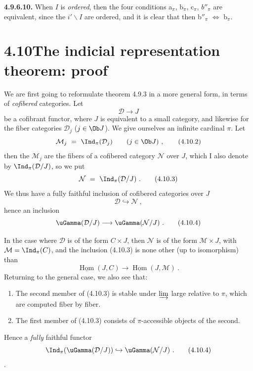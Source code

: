 \textbf{4.9.6.10.} When $I$ is \textit{ordered}, then the four conditions a$_\pi$, b$_\pi$, c$_\pi$, $b''_\pi$ are equivalent, since the $i'\backslash I$ are ordered, and it is clear that then b$''_\pi$ $\Longleftrightarrow$ b$_\pi$. %


\section*{4.10\quad The indicial representation theorem: proof}

We are first going to reformulate theorem 4.9.3 in a more general form, in terms of \textit{cofibered} categories. Let
\[
\mathcal{D} \longrightarrow J \tag*{(4.10.1)}
\]
be a cofibrant functor, where $J$ is equivalent to a small category, and likewise for the fiber categories $\mathcal{D}_j$ ($j \in \Ob J$). We give ourselves an infinite cardinal $\pi$. Let
\[
\mathcal{M}_j \ = \ \Ind_\pi(\mathcal{D}_j) \qquad (j \in \Ob J) \ , \tag*{(4.10.2)}
\]
then the $\mathcal{M}_j$ are the fibers of a cofibered category $\mathcal{N}$ over $J$, which I also denote by $\Ind_\pi(\mathcal{D}/J)$, so we put
\[
\mathcal{N} \ = \ \Ind_\pi(\mathcal{D}/J) \ . \tag*{(4.10.3)}
\]
We thus have a fully faithful inclusion of cofibered categories over $J$
\[
\mathcal{D} \hookrightarrow \mathcal{N} \ ,
\]
hence an inclusion
\[
\uGamma(\mathcal{D}/J) \longrightarrow \uGamma(\mathcal{N}/J) \ . \tag*{(4.10.4)}
\]

In the case where $\mathcal{D}$ is of the form $C \times J$, then $\mathcal{N}$ is of the form $\mathcal{M} \times J$, with $\mathcal{M} = \Ind_\pi(C)$, and the inclusion (4.10.3) is none other (up to isomorphism) than
\[
\underline{\operatorname{Hom}}(J, C) \longrightarrow \underline{\operatorname{Hom}}(J, \mathcal{M}) \ .
\]
Returning to the general case, we also see that:
\begin{enumerate}[label={}, leftmargin=3em]
\item[1°)] The second member of (4.10.3) is stable under $\varinjlim$ large relative to $\pi$, which are computed fiber by fiber.
\item[2°)] The first member of (4.10.3) consists of $\pi$-accessible objects of the second.
\end{enumerate}
Hence a \textit{fully} faithful functor
\[
\Ind_\pi(\uGamma(\mathcal{D}/J)) \hookrightarrow \uGamma(\mathcal{N}/J) \ . \tag*{(4.10.4)}
\]
\setcounter{footnote}{103}%
.

